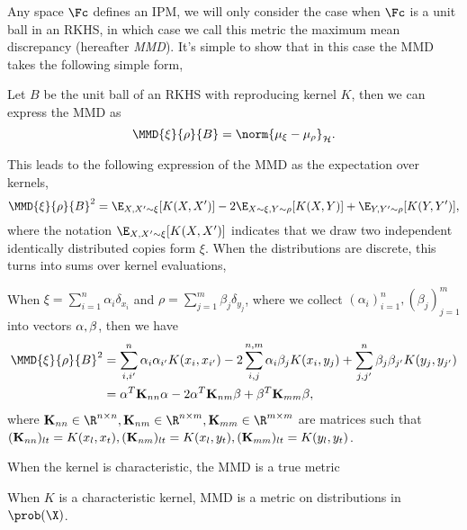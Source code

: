 Any space \(\Fc\) defines an IPM, we will only consider the case when \(\Fc\) is
a unit ball in an RKHS, in which case we call this metric the maximum mean
discrepancy (hereafter \emph{MMD}). It's simple to show that in this case the
MMD takes the following simple form,
\begin{theorem}
\label{th:mmd-is-norm-between-feature-maps} Let \(B\) be the unit ball of an
RKHS with reproducing kernel \(K\), then we can express the MMD as
\begin{equation}
\label{eq:mmd-is-norm-between-feature-maps} \MMD{\xi}{\rho}{B} = \norm{\mu_{\xi}
- \mu_{\rho}}_{\rkhs{H}}.
\end{equation}
\end{theorem} This leads to the following expression of the MMD as the
expectation over kernels,
\begin{equation}
\label{eq:mmd-expectation-over-kernels} \MMD{\xi}{\rho}{B}^{2} = \E_{X, X' \sim
\xi}[K(X, X')] - 2 \E_{X \sim \xi, Y \sim \rho}[K(X, Y)] + \E_{Y, Y' \sim
\rho}[K(Y, Y')],
\end{equation} where the notation \(\E_{X, X' \sim \xi}[K(X, X')]\) indicates
that we draw two independent identically distributed copies form \(\xi\). When
the distributions are discrete, this turns into sums over kernel evaluations,
\begin{corollary}
\label{cor:discrete-dists-MMD-sum} When \(\xi = \sum_{i=1}^{n}\alpha_{i}
\delta_{x_{i}}\) and \(\rho = \sum_{j=1}^{m} \beta_{j} \delta_{y_{j}}\), where
we collect \((\alpha_{i})_{i=1}^{n}, (\beta_{j})_{j=1}^{m}\) into vectors
\(\mathbf{\alpha}, \mathbf{\beta}\), then we have
  \begin{align} \MMD{\xi}{\rho}{B}^{2} & = \sum_{i, i'}^{n} \alpha_i
\alpha_{i'}K(x_i, x_{i'}) - 2 \sum_{i, j}^{n, m} \alpha_i \beta_j K(x_i, y_j) +
\sum_{j, j'}^{n} \beta_j \beta_{j'}K(y_j, y_{j'}) \\ & = \mat{\alpha}^T
\mat{K}_{nn} \mat{\alpha} - 2 \mat{\alpha}^T \mat{K}_{nm} \mat{\beta} +
\mat{\beta}^T \mat{K}_{mm} \mat{\beta},
  \end{align} where \(\mat{K}_{nn} \in \R^{n \times n}, \mat{K}_{nm} \in \R^{n
\times m}, \mat{K}_{mm} \in \R^{m \times m}\) are matrices such that
\((\mathbf{K}_{nn})_{lt} = K(x_l, x_t), (\mathbf{K}_{nm})_{lt} = K(x_l, y_t),
(\mathbf{K}_{mm})_{lt} = K(y_l, y_t)\).
\end{corollary}

When the kernel is characteristic, the MMD is a true metric
\begin{theorem}
\label{th:when-characteristic-kernel-mmd-is-metric} When \(K\) is a
characteristic kernel, MMD is a metric on distributions in \(\prob(\X)\).
\end{theorem}


